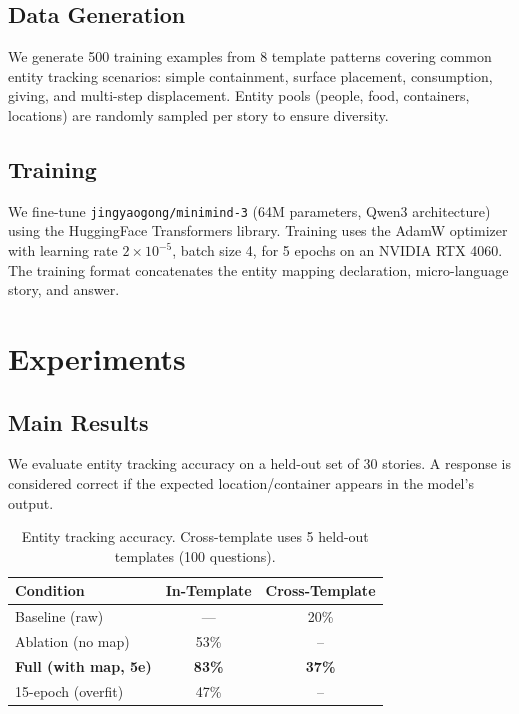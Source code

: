 \documentclass[11pt,a4paper]{article}
\begin{document}
\subsection{Data Generation}

We generate 500 training examples from 8 template patterns covering common entity tracking scenarios: simple containment, surface placement, consumption, giving, and multi-step displacement.
Entity pools (people, food, containers, locations) are randomly sampled per story to ensure diversity.

\subsection{Training}

We fine-tune \texttt{jingyaogong/minimind-3} (64M parameters, Qwen3 architecture) using the HuggingFace Transformers library.
Training uses the AdamW optimizer with learning rate $2\times10^{-5}$, batch size 4, for 5 epochs on an NVIDIA RTX 4060.
The training format concatenates the entity mapping declaration, micro-language story, and answer.

\section{Experiments}

\subsection{Main Results}

We evaluate entity tracking accuracy on a held-out set of 30 stories.
A response is considered correct if the expected location/container appears in the model's output.

\begin{table}[h]
\centering
\begin{tabular}{lcc}
\toprule
\textbf{Condition} & \textbf{In-Template} & \textbf{Cross-Template} \\
\midrule
Baseline (raw)      & ---    & 20\% \\
Ablation (no map)   & 53\%  & -- \\
\textbf{Full (with map, 5e)} & \textbf{83\%} & \textbf{37\%} \\
15-epoch (overfit)  & 47\%  & -- \\
\bottomrule
\end{tabular}
\caption{Entity tracking accuracy. Cross-template uses 5 held-out templates (100 questions).}
\label{tab:results}
\end{table}
\end{document}
